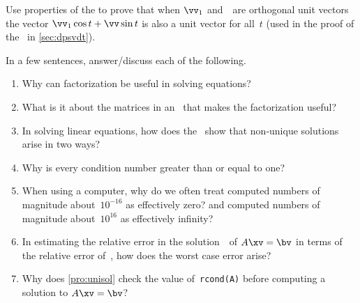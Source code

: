 \begin{exercise} \label{ex:univec} 
Use properties of the  to prove that when \(\vv_1\) and~\vv\ are orthogonal unit vectors the vector \(\vv_1\cos t+\vv\sin t\) is also a unit vector for all~\(t\)  (used in the proof of the \svd\ in \cref{sec:dpsvdt}).
\end{exercise}






\begin{exercise}  
In a few sentences, answer\slash discuss each of the following.
\begin{enumerate}
\item Why can factorization be useful in solving equations?

\item What is it about the matrices in an \svd\ that makes the factorization useful?

\item In solving linear equations, how does the \svd\ show that non-unique solutions arise in two ways?

\item Why is every condition number greater than or equal to one?

\item When using a computer, why do we often treat computed numbers of magnitude about~\(10^{-16}\) as effectively zero? and computed numbers of magnitude about~\(10^{16}\) as effectively infinity?

\item In estimating the relative error in the solution~\xv\ of \(A\xv=\bv\) in terms of the relative error of~\bv, how does the worst case error arise?

\item Why does \cref{pro:unisol} check the value of~\verb|rcond(A)| before computing a solution to \(A\xv=\bv\)?

\end{enumerate}
\end{exercise}


\begin{comment}%
why, what caused X?
how did X occur?
what-if? what-if-not?
how does X compare with Y?
what is the evidence for X?
why is X important?

Exercise Project on searching web pages (Higham, 2015a, pp.4--5) with authorities and hubs leads to SVD 
\end{comment}








